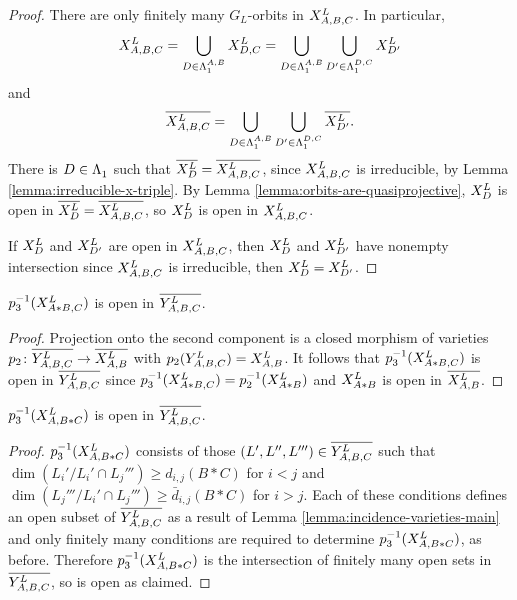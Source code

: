\documentclass[a4paper, 11pt]{report}
\begin{document}
\begin{proof}
There are only finitely many $G_L$-orbits in $\xprod[L]{A,B,C}$. In particular,
\begin{equation*}
\xprod[L]{A,B,C}=\bigcup_{D\in\matrices[A,B]}\xprod[L]{D,C}=\bigcup_{D\in\matrices[A,B]}\bigcup_{D'\in\matrices[D,C]}\xprod[L]{D'}
\end{equation*}
and
\begin{equation*}
\overline{\xprod[L]{A,B,C}} = \bigcup_{D\in\matrices[A,B]}\bigcup_{D'\in\matrices[D,C]}\overline{\xprod[L]{D'}}.
\end{equation*}
There is $D\in\matrices$ such that $\overline{\xprod[L]{D}}=\overline{\xprod[L]{A,B,C}}$, since $\xprod[L]{A,B,C}$ is irreducible, by Lemma \ref{lemma:irreducible-x-triple}. By Lemma \ref{lemma:orbits-are-quasiprojective}, $\xprod[L]{D}$ is open in $\overline{\xprod[L]{D}}=\overline{\xprod[L]{A,B,C}}$, so $\xprod[L]{D}$ is open in $\xprod[L]{A,B,C}$.

If $\xprod[L]{D}$ and $\xprod[L]{D'}$ are open in $\xprod[L]{A,B,C}$, then $\xprod[L]{D}$ and $\xprod[L]{D'}$ have nonempty intersection since $\xprod[L]{A,B,C}$ is irreducible, then $\xprod[L]{D}=\xprod[L]{D'}$.
\end{proof}

\begin{lemma}\label{lemma:yprod-generic-A-B}
$p_3^{-1}(\xprod[L]{A\ast B,C})$ is open in $\overline{\yprod[L]{A,B,C}}$.
\end{lemma}

\begin{proof}
Projection onto the second component is a closed morphism of varieties $p_2\colon\overline{\yprod[L]{A,B,C}}\to\overline{\xprod[L]{A,B}}$ with $p_2(\yprod[L]{A,B,C})=\xprod[L]{A,B}$. It follows that $p_3^{-1}(\xprod[L]{A\ast B,C})$ is open in $\overline{\yprod[L]{A,B,C}}$ since $p_3^{-1}(\xprod[L]{A\ast B,C})=p_2^{-1}(\xprod[L]{A\ast B})$ and $\xprod[L]{A\ast B}$ is open in $\overline{\xprod[L]{A,B}}$.
\end{proof}

\begin{lemma}\label{lemma:yprod-generic-B-C}
$p_3^{-1}(\xprod[L]{A,B\ast C})$ is open in $\overline{\yprod[L]{A,B,C}}$.
\end{lemma}

\begin{proof}
$p_3^{-1}(\xprod[L]{A,B\ast C})$ consists of those $(L',L'',L''')\in\overline{\yprod[L]{A,B,C}}$ such that $\dim\left(L_i'/{L_i'\cap L_j'''}\right)\geq d_{i,j}(B\ast C)$ for $i<j$ and $\dim\left(L_j'''/{L_i'\cap L_j'''}\right)\geq\bar{d}_{i,j}(B\ast C)$ for $i>j$. Each of these conditions defines an open subset of $\overline{\yprod[L]{A,B,C}}$ as a result of Lemma \ref{lemma:incidence-varieties-main} and only finitely many conditions are required to determine $p_3^{-1}(\xprod[L]{A,B\ast C})$, as before. Therefore $p_3^{-1}(\xprod[L]{A,B\ast C})$ is the intersection of finitely many open sets in $\overline{\yprod[L]{A,B,C}}$, so is open as claimed.
\end{proof}
\end{document}
